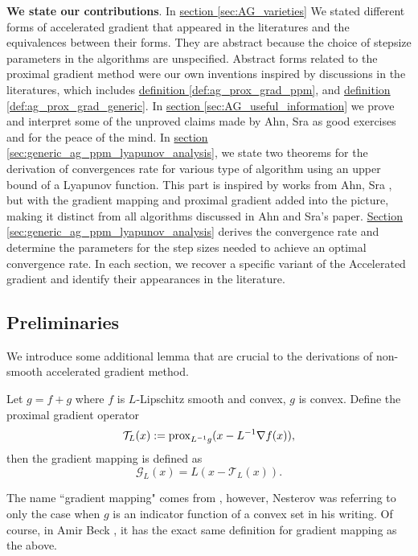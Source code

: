     \par\noindent
    \textbf{We state our contributions}. 
    In \hyperref[sec:AG_varieties]{section \ref*{sec:AG_varieties}} 
    We stated different forms of accelerated gradient that appeared in the literatures and the equivalences between their forms. 
    They are abstract because the choice of stepsize parameters in the algorithms are unspecified. 
    Abstract forms related to the proximal gradient method were our own inventions inspired by discussions in the literatures, which includes 
    \hyperref[def:ag_prox_grad_ppm]{definition \ref*{def:ag_prox_grad_ppm}}, and 
    \hyperref[def:ag_prox_grad_generic]{definition \ref*{def:ag_prox_grad_generic}}. 
    In \hyperref[sec:AG_useful_information]{section \ref*{sec:AG_useful_information}}
    we prove and interpret some of the unproved claims made by Ahn, Sra \cite{ahn_understanding_2022} as good exercises and for the peace of the mind. 
    In
    \hyperref[sec:generic_ag_ppm_lyapunov_analysis]{section \ref*{sec:generic_ag_ppm_lyapunov_analysis}},
    we state two theorems for the derivation of convergences rate for various type of algorithm using an upper bound of a Lyapunov function. 
    This part is inspired by works from Ahn, Sra \cite{ahn_understanding_2022}, but with the gradient mapping and proximal gradient added into the picture, making it distinct from all algorithms discussed in Ahn and Sra's paper. 
    \hyperref[sec:generic_ag_ppm_lyapunov_analysis]
        {Section \ref*{sec:generic_ag_ppm_lyapunov_analysis}} 
    derives the convergence rate and determine the parameters for the step sizes needed to achieve an optimal convergence rate. 
    In each section, we recover a specific variant of the Accelerated gradient and identify their appearances in the literature. 


\subsection{Preliminaries}
    We introduce some additional lemma that are crucial to the derivations of non-smooth accelerated gradient method. 
    \begin{definition}
        \label{def:gradient_mapping}
        Let $g = f + g$ where $f$ is $L$-Lipschitz smooth and convex, $g$ is convex. 
        Define the proximal gradient operator
        $$
            \mathcal T_L(x) := \operatorname{prox}_{L^{-1}g}(x - L^{-1}\nabla f(x)),
        $$
        then the gradient mapping is defined as
        $$
            \mathcal G_L(x) = L(x - \mathcal T_L(x)). 
        $$
    \end{definition}
    \begin{remark}
        The name ``gradient mapping" comes from \cite[(2.2.54)]{nesterov_lectures_2018}, however, Nesterov was referring to only the case when $g$ is an indicator function of a convex set in his writing. 
        Of course, in Amir Beck \cite[10.3.2]{beck_first-order_nodate}, it has the exact same definition for gradient mapping as the above. 
    \end{remark}


